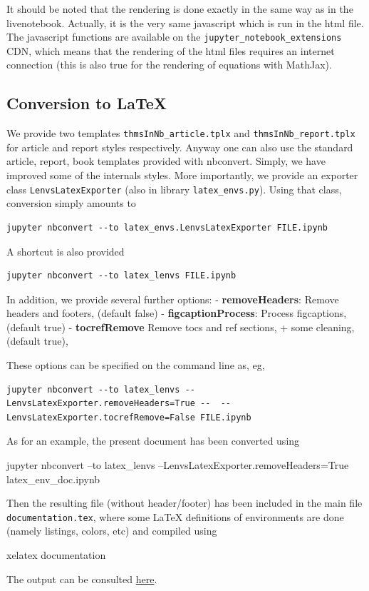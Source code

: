 It should be noted that the rendering is done exactly in the same way as
in the livenotebook. Actually, it is the very same javascript which is
run in the html file. The javascript functions are available on the
\texttt{jupyter\_notebook\_extensions} CDN, which means that the
rendering of the html files requires an internet connection (this is
also true for the rendering of equations with MathJax).

\subsection{Conversion to LaTeX}\label{conversion-to-latex}

We provide two templates \texttt{thmsInNb\_article.tplx} and
\texttt{thmsInNb\_report.tplx} for article and report styles
respectively. Anyway one can also use the standard article, report, book
templates provided with nbconvert. Simply, we have improved some of the
internals styles. More importantly, we provide an exporter class
\texttt{LenvsLatexExporter} (also in library \texttt{latex\_envs.py}).
Using that class, conversion simply amounts to

\begin{verbatim}
jupyter nbconvert --to latex_envs.LenvsLatexExporter FILE.ipynb
\end{verbatim}

A shortcut is also provided

\begin{verbatim}
jupyter nbconvert --to latex_lenvs FILE.ipynb
\end{verbatim}

In addition, we provide several further options: -
\textbf{removeHeaders}: Remove headers and footers, (default false) -
\textbf{figcaptionProcess}: Process figcaptions, (default true) -
\textbf{tocrefRemove} Remove tocs and ref sections, + some cleaning,
(default true),

These options can be specified on the command line as, eg,

\begin{verbatim}
jupyter nbconvert --to latex_lenvs --LenvsLatexExporter.removeHeaders=True --  --LenvsLatexExporter.tocrefRemove=False FILE.ipynb
\end{verbatim}

    \begin{example}
As for an example, the present document has
been converted using
 
 jupyter nbconvert --to latex\_lenvs
--LenvsLatexExporter.removeHeaders=True latex\_env\_doc.ipynb


Then the resulting file (without header/footer) has been included in
the main file \texttt{documentation.tex}, where some LaTeX definitions
of environments are done (namely listings, colors, etc) and compiled
using 
 
 xelatex documentation
 
The output can be
consulted \href{documentation.pdf}{here}. 
\end{example}


